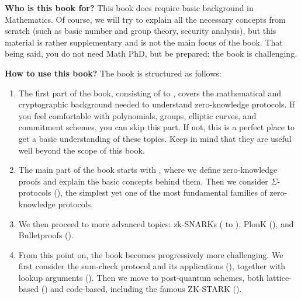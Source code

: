 \documentclass[../../book]{subfiles}
\begin{document}
\textbf{Who is this book for?} This book does require basic background in
Mathematics. Of course, we will try to explain all the necessary concepts from
scratch (such as basic number and group theory, security analysis), but this
material is rather supplementary and is not the main focus of the book. That
being said, you do not need Math PhD, but be prepared: the book is challenging.

\textbf{How to use this book?} The book is structured as follows:
\begin{enumerate}
    \item The first part of the book, consisting of  to , covers the mathematical and cryptographic background needed to understand zero-knowledge protocols.
    If you feel comfortable with polynomials, groups, elliptic curves, and commitment schemes, you can skip this part.
    If not, this is a perfect place to get a basic understanding of these topics.
    Keep in mind that they are useful well beyond the scope of this book.
    \item The main part of the book starts with , where we define zero-knowledge proofs and explain the basic concepts behind them.
    Then we consider $\Sigma$-protocols (), the simplest yet one of the most fundamental families of zero-knowledge protocols.
    \item We then proceed to more advanced topics: zk-SNARKs ( to ), PlonK (), and Bulletproofs ().
    \item From this point on, the book becomes progressively more challenging.
    We first consider the sum-check protocol and its applications (), together with lookup arguments ().
    Then we move to post-quantum schemes, both lattice-based () and code-based, including the famous ZK-STARK ().
\end{enumerate}
\end{document}
